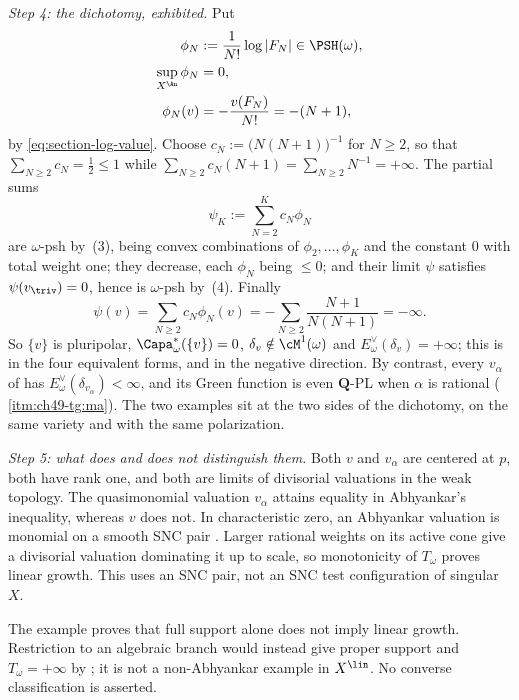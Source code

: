 \begin{example}
\emph{Step 4: the dichotomy, exhibited.}  Put
\[
 \begin{aligned}
  \phi_N&:=\frac1{N!}\log|F_N|\in\PSH(\omega),\\
  \sup_{X^{\An}}\phi_N&=0,\\
  \phi_N(v)&=-\frac{v(F_N)}{N!}=-(N+1),
 \end{aligned}
\]
by \eqref{eq:section-log-value}.  Choose
$c_N:=\bigl(N(N+1)\bigr)^{-1}$ for $N\ge2$, so that
$\sum_{N\ge2}c_N=\tfrac12\le1$ while
$\sum_{N\ge2}c_N(N+1)=\sum_{N\ge2}N^{-1}=+\infty$.  The partial sums
\[
 \psi_K:=\sum_{N=2}^{K}c_N\phi_N
\]
are $\omega$-psh by \,(3), being convex
combinations of $\phi_2,\dots,\phi_K$ and the constant $0$ with total
weight one; they decrease, each $\phi_N$ being $\le0$; and their limit
$\psi$ satisfies $\psi(v_{\triv})=0$, hence is $\omega$-psh by
\,(4).  Finally
\[
 \psi(v)=\sum_{N\ge2}c_N\phi_N(v)=-\sum_{N\ge2}\frac{N+1}{N(N+1)}=-\infty .
\]
So $\{v\}$ is pluripolar, $\Capa^*_\omega(\{v\})=0$,
$\delta_v\notin\cM^1(\omega)$ and
$E^\vee_\omega(\delta_v)=+\infty$; this is
 in the four equivalent forms, and
 in the negative direction.  By contrast,
every $v_\alpha$ of  has
$E^\vee_\omega(\delta_{v_\alpha})<\infty$, and its Green function is even
$\mathbf Q$-PL when $\alpha$ is rational
(\,\cref{itm:ch49-tg:ma}).  The two examples
sit at the two sides of the dichotomy, on the same variety and with the
same polarization.

\emph{Step 5: what does and does not distinguish them.}  Both $v$ and
$v_\alpha$ are centered at $p$, both have rank one, and both are limits
of divisorial valuations in the weak topology.  The quasimonomial valuation $v_\alpha$ attains equality in
Abhyankar's inequality, whereas $v$ does not.  In characteristic zero,
an Abhyankar valuation is monomial on a smooth SNC pair
\cite[\S3]{JM12}.  Larger rational weights on its active
cone give a divisorial valuation dominating it up to scale, so
monotonicity of $T_\omega$ proves linear growth.
This uses an SNC pair, not an SNC test configuration of singular $X$.

The example proves that full support alone does not imply linear
growth.  Restriction to an algebraic branch would instead give
proper support and $T_\omega=+\infty$ by
; it is not a non-Abhyankar
example in $X^{\lin}$.  No converse classification is asserted.
\end{example}

